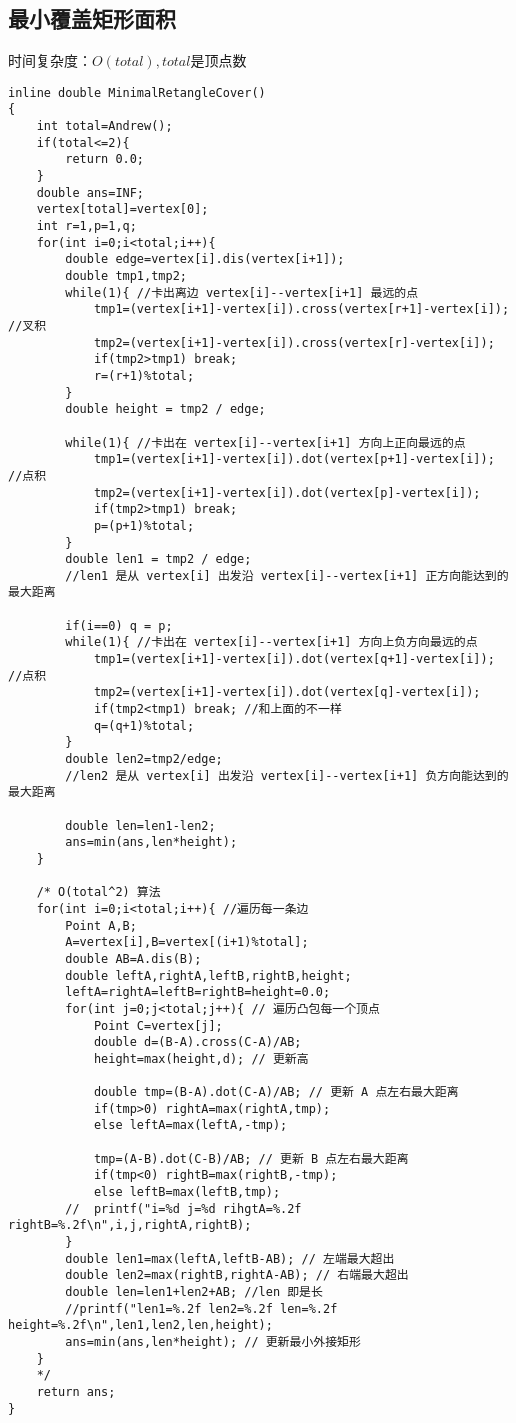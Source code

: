 \subsection{最小覆盖矩形面积}
时间复杂度：$O(total),total$是顶点数
\begin{lstlisting}
inline double MinimalRetangleCover()
{
    int total=Andrew();
    if(total<=2){
        return 0.0;
    }
    double ans=INF;
    vertex[total]=vertex[0];
    int r=1,p=1,q;
    for(int i=0;i<total;i++){
        double edge=vertex[i].dis(vertex[i+1]);
        double tmp1,tmp2;
        while(1){ //卡出离边 vertex[i]--vertex[i+1] 最远的点
            tmp1=(vertex[i+1]-vertex[i]).cross(vertex[r+1]-vertex[i]); //叉积
            tmp2=(vertex[i+1]-vertex[i]).cross(vertex[r]-vertex[i]);
            if(tmp2>tmp1) break;
            r=(r+1)%total;
        }
        double height = tmp2 / edge;

        while(1){ //卡出在 vertex[i]--vertex[i+1] 方向上正向最远的点
            tmp1=(vertex[i+1]-vertex[i]).dot(vertex[p+1]-vertex[i]); //点积
            tmp2=(vertex[i+1]-vertex[i]).dot(vertex[p]-vertex[i]);
            if(tmp2>tmp1) break;
            p=(p+1)%total;
        }
        double len1 = tmp2 / edge;
        //len1 是从 vertex[i] 出发沿 vertex[i]--vertex[i+1] 正方向能达到的最大距离

        if(i==0) q = p;
        while(1){ //卡出在 vertex[i]--vertex[i+1] 方向上负方向最远的点
            tmp1=(vertex[i+1]-vertex[i]).dot(vertex[q+1]-vertex[i]); //点积
            tmp2=(vertex[i+1]-vertex[i]).dot(vertex[q]-vertex[i]);
            if(tmp2<tmp1) break; //和上面的不一样
            q=(q+1)%total;
        }
        double len2=tmp2/edge;
        //len2 是从 vertex[i] 出发沿 vertex[i]--vertex[i+1] 负方向能达到的最大距离

        double len=len1-len2;
        ans=min(ans,len*height);
    }

    /* O(total^2) 算法
    for(int i=0;i<total;i++){ //遍历每一条边
        Point A,B;
        A=vertex[i],B=vertex[(i+1)%total];
        double AB=A.dis(B);
        double leftA,rightA,leftB,rightB,height;
        leftA=rightA=leftB=rightB=height=0.0;
        for(int j=0;j<total;j++){ // 遍历凸包每一个顶点
            Point C=vertex[j];
            double d=(B-A).cross(C-A)/AB;
            height=max(height,d); // 更新高

            double tmp=(B-A).dot(C-A)/AB; // 更新 A 点左右最大距离
            if(tmp>0) rightA=max(rightA,tmp);
            else leftA=max(leftA,-tmp);

            tmp=(A-B).dot(C-B)/AB; // 更新 B 点左右最大距离
            if(tmp<0) rightB=max(rightB,-tmp);
            else leftB=max(leftB,tmp);
        //  printf("i=%d j=%d rihgtA=%.2f rightB=%.2f\n",i,j,rightA,rightB);
        }
        double len1=max(leftA,leftB-AB); // 左端最大超出
        double len2=max(rightB,rightA-AB); // 右端最大超出
        double len=len1+len2+AB; //len 即是长
        //printf("len1=%.2f len2=%.2f len=%.2f height=%.2f\n",len1,len2,len,height);
        ans=min(ans,len*height); // 更新最小外接矩形
    }
    */
    return ans;
}
\end{lstlisting}

